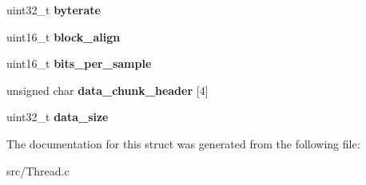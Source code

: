 \begin{DoxyCompactItemize}
uint32\+\_\+t {\bfseries byterate}
\item 
\mbox{\label{struct_w_a_v_h_e_a_d_e_r_a5cef5e91f9d1495fdf2da05b67adcb5e}} 
uint16\+\_\+t {\bfseries block\+\_\+align}
\item 
\mbox{\label{struct_w_a_v_h_e_a_d_e_r_a1eca7ea126c126e0ed765cc1b3cb477d}} 
uint16\+\_\+t {\bfseries bits\+\_\+per\+\_\+sample}
\item 
\mbox{\label{struct_w_a_v_h_e_a_d_e_r_a2c3167f6bf009f7302705afdedc68497}} 
unsigned char {\bfseries data\+\_\+chunk\+\_\+header} \mbox{[}4\mbox{]}
\item 
\mbox{\label{struct_w_a_v_h_e_a_d_e_r_ad8d1eefaf5943258b3d71a799f0ea382}} 
uint32\+\_\+t {\bfseries data\+\_\+size}
\end{DoxyCompactItemize}


The documentation for this struct was generated from the following file\+:\begin{DoxyCompactItemize}
\item 
src/Thread.\+c\end{DoxyCompactItemize}

